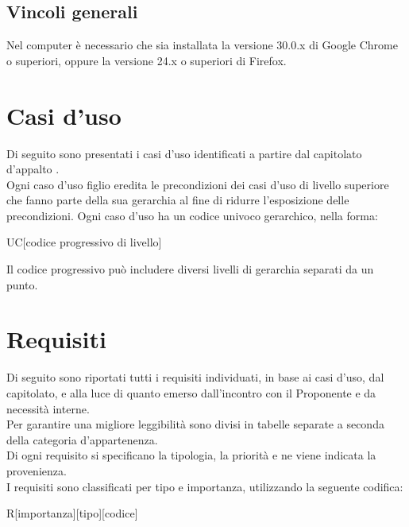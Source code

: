 \subsection{Vincoli generali}
\label{2.4}
Nel computer è necessario che sia installata la versione 30.0.x di Google Chrome o superiori, oppure la versione 24.x o superiori di Firefox.

\newpage
\section{Casi d'uso} %
\label{3.0}
Di seguito sono presentati i casi d'uso identificati a partire dal capitolato d'appalto \Progetto. \\
Ogni caso d'uso figlio eredita le precondizioni dei casi d'uso di livello superiore che fanno parte della sua gerarchia al fine di ridurre l'esposizione delle precondizioni.
Ogni caso d'uso ha un codice univoco gerarchico, nella forma:
\begin{center}
UC[codice progressivo di livello]
\end{center}
Il codice progressivo può includere diversi livelli di gerarchia separati da un punto.



\newpage


\newpage


\newpage
\section{Requisiti} %
\label{4.0}
Di seguito sono riportati tutti i requisiti individuati, in base ai casi d'uso, dal capitolato, e alla luce di quanto emerso dall'incontro con il Proponente e da necessità interne.\\
Per garantire una migliore leggibilità sono divisi in tabelle separate a seconda della categoria d'appartenenza.\\
Di ogni requisito si specificano la tipologia, la priorità e ne viene indicata la provenienza.\\
I requisiti sono classificati per tipo e importanza, utilizzando la seguente codifica:\\
\begin{center}
R[importanza][tipo][codice]
\end{center}

